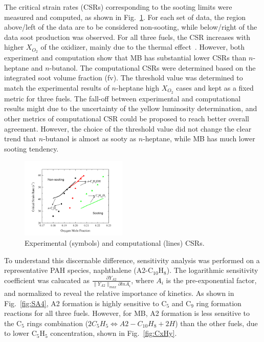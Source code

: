 \documentclass[preprint,3p,times,twocolumn]{elsarticleUS}
\begin{document}
The critical strain rates (CSRs) corresponding to the sooting limits were measured and computed, as shown in Fig.~\ref{fig:Exp-Comp}. For each set of data, the region above/left of the data are to be considered non-sooting, while below/right of the data soot production was observed. For all three fuels, the CSR increases with higher $X_{O_2}$ of the oxidizer, mainly due to the thermal effect~\cite{du91}. However, both experiment and computation show that MB has substantial lower CSRs than $n$-heptane and $n$-butanol. The computational CSRs were determined based on the integrated soot volume fraction (fv). The threshold value was determined to match the experimental results of $n$-heptane high $X_{O_2}$ cases and kept as a fixed metric for three fuels. The fall-off between experimental and computational results might due to the uncertainty of the yellow luminosity determination, and other metrics of computational CSR could be proposed to reach better overall agreement. However, the choice of the threshold value did not change the clear trend that $n$-butanol is almost as sooty as $n$-heptane, while MB has much lower sooting tendency.

\begin{figure}[hp]
  \centering
  \scriptsize
  \vspace{-0.1in}
  \includegraphics[width=0.45\textwidth]{Exp-Comp.png}
  \normalsize
  \vspace{-0.2in}
  \caption{Experimental (symbols) and computational (lines) CSRs. }
  \label{fig:Exp-Comp}
\end{figure}

To understand this discernable difference, sensitivity analysis was performed on a representative PAH species, naphthalene (A2-C$_{10}$H$_8$). The logarithmic sensitivity coefficient was calucated as $\frac{\partial {Y_{A2}}}{\|Y_{A2}\|_{max}\partial {lnA_i}}$, where $A_i$ is the pre-exponential factor, and normalized to reveal the relative importance of kinetics. As shown in Fig.~\ref{fig:SA4}, A2 formation is highly sensitive to C$_5$ and C$_9$ ring formation reactions for all three fuels. However, for MB, A2 formation is less sensitive to the C$_5$ rings combination ($2C_5H_5 \Longleftrightarrow A2-C_{10}H_8 + 2H$) than the other fuels, due to lower C$_5$H$_5$ concentration, shown in Fig.~\ref{fig:CxHy}. 
\end{document}
